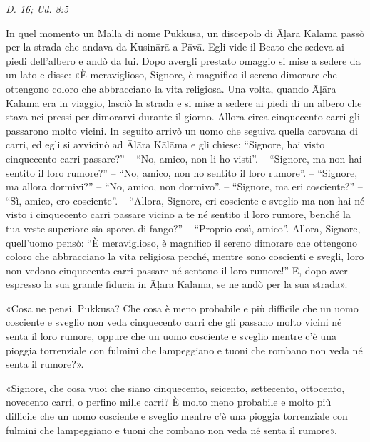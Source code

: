 \emph{D. 16; Ud. 8:5}


In quel momento un Malla di nome Pukkusa, un discepolo di Āḷāra Kālāma
passò per la strada che andava da Kusinārā a Pāvā. Egli vide il Beato
che sedeva ai piedi dell’albero e andò da lui. Dopo avergli prestato
omaggio si mise a sedere da un lato e disse: «È meraviglioso, Signore, è
magnifico il sereno dimorare che ottengono coloro che abbracciano la
vita religiosa. Una volta, quando Āḷāra Kālāma era in viaggio, lasciò la
strada e si mise a sedere ai piedi di un albero che stava nei pressi per
dimorarvi durante il giorno. Allora circa cinquecento carri gli
passarono molto vicini. In seguito arrivò un uomo che seguiva quella
carovana di carri, ed egli si avvicinò ad Āḷāra Kālāma e gli chiese:
“Signore, hai visto cinquecento carri passare?” – “No, amico, non li ho
visti”. – “Signore, ma non hai sentito il loro rumore?” – “No, amico,
non ho sentito il loro rumore”. – “Signore, ma allora dormivi?” – “No,
amico, non dormivo”. – “Signore, ma eri cosciente?” – “Sì, amico, ero
cosciente”. – “Allora, Signore, eri cosciente e sveglio ma non hai né
visto i cinquecento carri passare vicino a te né sentito il loro rumore,
benché la tua veste superiore sia sporca di fango?” – “Proprio così,
amico”. Allora, Signore, quell’uomo pensò: “È meraviglioso, è magnifico
il sereno dimorare che ottengono coloro che abbracciano la vita
religiosa perché, mentre sono coscienti e svegli, loro non vedono
cinquecento carri passare né sentono il loro rumore!” E, dopo aver
espresso la sua grande fiducia in Āḷāra Kālāma, se ne andò per la sua
strada».


«Cosa ne pensi, Pukkusa? Che cosa è meno probabile e più difficile che
un uomo cosciente e sveglio non veda cinquecento carri che gli passano
molto vicini né senta il loro rumore, oppure che un uomo cosciente e
sveglio mentre c’è una pioggia torrenziale con fulmini che lampeggiano e
tuoni che rombano non veda né senta il rumore?».


«Signore, che cosa vuoi che siano cinquecento, seicento, settecento,
ottocento, novecento carri, o perfino mille carri? È molto meno
probabile e molto più difficile che un uomo cosciente e sveglio mentre
c’è una pioggia torrenziale con fulmini che lampeggiano e tuoni che
rombano non veda né senta il rumore».


